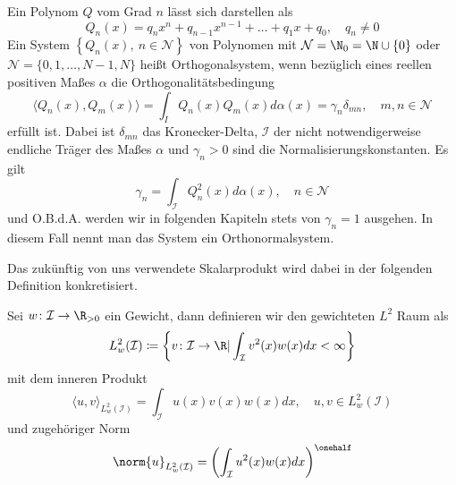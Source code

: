 \begin{mathdef}
Ein Polynom $Q$ vom Grad $n$ lässt sich darstellen als
\[Q_n(x)=q_nx^n+q_{n-1}x^{n-1}+\dots+q_1x+q_0,\quad q_n\ne 0\]
Ein System $\left\lbrace Q_n(x),\: n\in\mathcal{N}\right\rbrace$ von Polynomen mit $\mathcal{N}=\N_0=\N\cup\lbrace 0\rbrace$ oder $\mathcal{N}=\lbrace 0,1,\dots,N-1,N\rbrace$ heißt Orthogonalsystem, wenn bezüglich eines reellen positiven Maßes $\alpha$ die Orthogonalitätsbedingung
 \[\langle Q_n(x),Q_m(x)\rangle =\int_I Q_n(x)Q_m(x)d\alpha(x)=\gamma_n\delta_{mn},\quad m,n\in\mathcal{N}\]
 erfüllt ist. Dabei ist $\delta_{mn}$ das Kronecker-Delta, $\mathcal{I}$ der nicht notwendigerweise endliche Träger des Maßes $\alpha$ und $\gamma_n>0$ sind die Normalisierungskonstanten. Es gilt 
 \[\gamma_n=\int_\mathcal{I} Q_n^2(x)d\alpha(x),\quad n\in\mathcal{N}\] und O.B.d.A. werden wir in folgenden Kapiteln stets von $\gamma_n=1$ ausgehen. In diesem Fall nennt man das System ein Orthonormalsystem.
\end{mathdef}
Das zukünftig von uns verwendete Skalarprodukt wird dabei in der folgenden Definition konkretisiert.
\begin{mathdef}
Sei $w\colon \mathcal{I}\to\R_{>0}$ ein Gewicht, dann definieren wir den gewichteten $L^2$ Raum als
\begin{equation*}
L_w^2(\mathcal{I})\coloneqq \left\lbrace v\colon \mathcal{I}\to\R | \int_\mathcal{I}v^2(x)w(x)dx<\infty\right\rbrace
\end{equation*}
mit dem inneren Produkt 
\[\langle u,v\rangle_{L_w^2(\mathcal{I})}=\int_\mathcal{I} u(x)v(x)w(x)dx,\quad u,v\in L_w^2(\mathcal{I})\]
und zugehöriger Norm
\[\norm{u}_{L_w^2(\mathcal{I})}=\left(\int_\mathcal{I} u^2(x)w(x)dx\right)^{\onehalf}\]
\end{mathdef}

